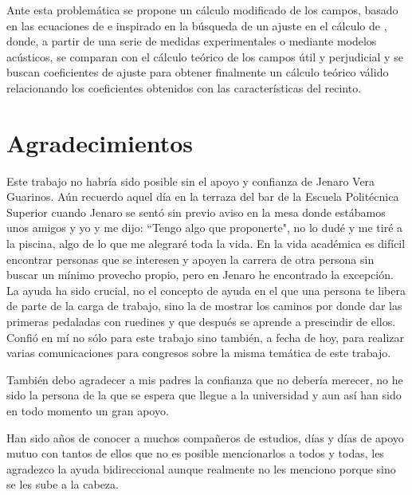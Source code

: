 Ante esta problemática se propone un cálculo modificado de los campos, basado en las ecuaciones de \citeauthor{Barron1988} e inspirado en la búsqueda de un ajuste en el cálculo de \cite{Sato2008},  donde, a partir de una serie de medidas experimentales o mediante modelos acústicos, se comparan con el cálculo teórico de los campos útil y perjudicial y se buscan coeficientes de ajuste para obtener finalmente un cálculo teórico válido relacionando los coeficientes obtenidos con las características del recinto.



\cleardoublepage %
\chapter*{Agradecimientos}

\thispagestyle{empty}
\vspace{1cm}

Este trabajo no habría sido posible sin el apoyo y confianza de Jenaro Vera Guarinos. Aún recuerdo aquel día en la terraza del bar de la Escuela Politécnica Superior cuando Jenaro se sentó sin previo aviso en la mesa donde estábamos unos amigos y yo y me dijo: ``Tengo algo que proponerte", no lo dudé y me tiré a la piscina, algo de lo que me alegraré toda la vida.
En la vida académica es difícil encontrar personas que se interesen y apoyen la carrera de otra persona sin buscar un mínimo provecho propio, pero en Jenaro he encontrado la excepción. La ayuda ha sido crucial, no el concepto de ayuda en el que una persona te libera de parte de la carga de trabajo, sino la de mostrar los caminos por donde dar las primeras pedaladas con ruedines y que después se aprende a prescindir de ellos. 
Confió en mí no sólo para este trabajo sino también, a fecha de hoy, para realizar varias comunicaciones para congresos sobre la misma temática de este trabajo.


También debo agradecer a mis padres la confianza que no debería merecer, no he sido la persona de la que se espera que llegue a la universidad y aun así han sido en todo momento un gran apoyo.

Han sido años de conocer a muchos compañeros de estudios, días y días de apoyo mutuo con tantos de ellos que no es posible mencionarlos a todos y todas, les agradezco la ayuda bidireccional aunque realmente no les menciono porque sino se les sube a la cabeza.



